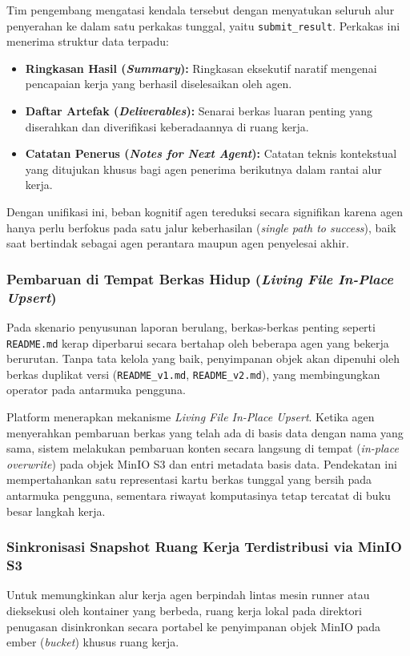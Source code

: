 Tim pengembang mengatasi kendala tersebut dengan menyatukan seluruh alur penyerahan ke dalam satu perkakas tunggal, yaitu \texttt{submit\_result}. Perkakas ini menerima struktur data terpadu:
\begin{itemize}
  \item \textbf{Ringkasan Hasil (\textit{Summary}):} Ringkasan eksekutif naratif mengenai pencapaian kerja yang berhasil diselesaikan oleh agen.
  \item \textbf{Daftar Artefak (\textit{Deliverables}):} Senarai berkas luaran penting yang diserahkan dan diverifikasi keberadaannya di ruang kerja.
  \item \textbf{Catatan Penerus (\textit{Notes for Next Agent}):} Catatan teknis kontekstual yang ditujukan khusus bagi agen penerima berikutnya dalam rantai alur kerja.
\end{itemize}
Dengan unifikasi ini, beban kognitif agen tereduksi secara signifikan karena agen hanya perlu berfokus pada satu jalur keberhasilan (\textit{single path to success}), baik saat bertindak sebagai agen perantara maupun agen penyelesai akhir.

\subsubsection{Pembaruan di Tempat Berkas Hidup (\textit{Living File In-Place Upsert})}
Pada skenario penyusunan laporan berulang, berkas-berkas penting seperti \texttt{README.md} kerap diperbarui secara bertahap oleh beberapa agen yang bekerja berurutan. Tanpa tata kelola yang baik, penyimpanan objek akan dipenuhi oleh berkas duplikat versi (\texttt{README\_v1.md}, \texttt{README\_v2.md}), yang membingungkan operator pada antarmuka pengguna.

Platform menerapkan mekanisme \textit{Living File In-Place Upsert}. Ketika agen menyerahkan pembaruan berkas yang telah ada di basis data dengan nama yang sama, sistem melakukan pembaruan konten secara langsung di tempat (\textit{in-place overwrite}) pada objek MinIO S3 dan entri metadata basis data. Pendekatan ini mempertahankan satu representasi kartu berkas tunggal yang bersih pada antarmuka pengguna, sementara riwayat komputasinya tetap tercatat di buku besar langkah kerja.

\subsubsection{Sinkronisasi Snapshot Ruang Kerja Terdistribusi via MinIO S3}
Untuk memungkinkan alur kerja agen berpindah lintas mesin runner atau dieksekusi oleh kontainer yang berbeda, ruang kerja lokal pada direktori penugasan disinkronkan secara portabel ke penyimpanan objek MinIO pada ember (\textit{bucket}) khusus ruang kerja.

